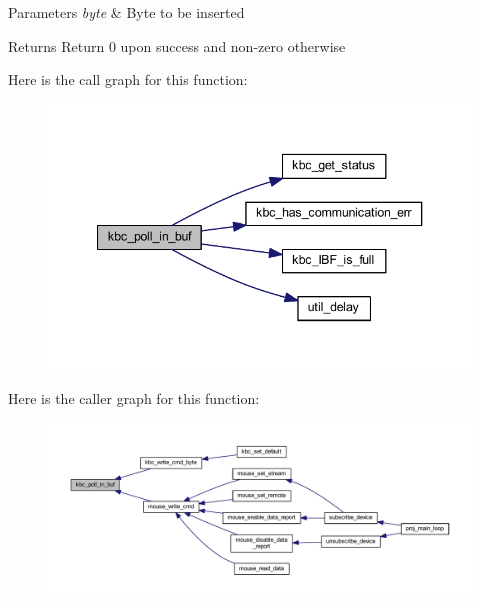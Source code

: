 \begin{DoxyParams}{Parameters}
{\em byte} & Byte to be inserted \\
\hline
\end{DoxyParams}
\begin{DoxyReturn}{Returns}
Return 0 upon success and non-\/zero otherwise 
\end{DoxyReturn}
Here is the call graph for this function\+:\nopagebreak
\begin{figure}[H]
\begin{center}
\leavevmode
\includegraphics[width=340pt]{group__keyboard_ga26b9ea576b6e214c7748979568e97c7c_cgraph}
\end{center}
\end{figure}
Here is the caller graph for this function\+:\nopagebreak
\begin{figure}[H]
\begin{center}
\leavevmode
\includegraphics[width=350pt]{group__keyboard_ga26b9ea576b6e214c7748979568e97c7c_icgraph}
\end{center}
\end{figure}
\mbox{\label{group__keyboard_ga203a4c111fbe4b4fe6946a77bebbc171}} 
